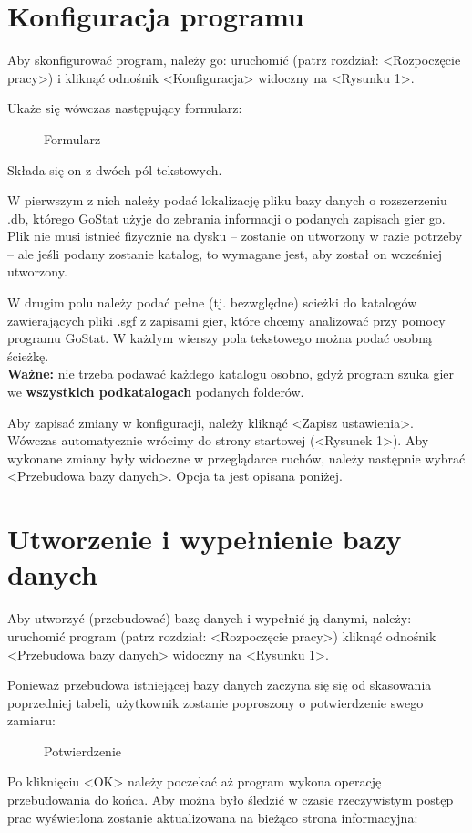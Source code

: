 \documentclass[10pt,leqno]{article}
\newcommand{\myimage}[3]{
  \begin{figure}[h!]
    \centering
      \fbox{\texttt{[image: \#2]}}
  \caption{#3}
  \end{figure}
}
\begin{document}
\section{Konfiguracja programu}
Aby skonfigurować program, należy go: uruchomić (patrz rozdział: <Rozpoczęcie pracy>) i kliknąć odnośnik <Konfiguracja> widoczny na <Rysunku 1>.

Ukaże się wówczas następujący formularz:

\newpage

\myimage{0.4}{formularz.png}{Formularz}

Składa się on z dwóch pól tekstowych. 

W pierwszym z nich należy podać lokalizację pliku bazy danych o rozszerzeniu .db, którego GoStat użyje do zebrania informacji o podanych zapisach gier go.
Plik nie musi istnieć fizycznie na dysku -- zostanie on utworzony w razie potrzeby -- ale jeśli podany zostanie katalog, to wymagane jest, aby został on
wcześniej utworzony.

W drugim polu należy podać pełne (tj. bezwględne) scieżki do katalogów zawierających pliki .sgf z zapisami gier, które chcemy analizować przy pomocy
programu GoStat. W każdym wierszy pola tekstowego można podać osobną ścieżkę. \\
\textbf{Ważne:} nie trzeba podawać każdego katalogu osobno, gdyż program szuka gier we \textbf{wszystkich podkatalogach} podanych folderów.

Aby zapisać zmiany w konfiguracji, należy kliknąć <Zapisz ustawienia>. Wówczas automatycznie wrócimy do strony startowej (<Rysunek 1>). 
Aby wykonane zmiany były widoczne w przeglądarce ruchów, należy następnie wybrać <Przebudowa bazy danych>. Opcja ta jest opisana poniżej.

\section{Utworzenie i wypełnienie bazy danych}
Aby utworzyć (przebudować) bazę danych i wypełnić ją danymi, należy: 
  uruchomić program (patrz rozdział: <Rozpoczęcie pracy>)
  kliknąć odnośnik <Przebudowa bazy danych> widoczny na <Rysunku 1>.

Ponieważ przebudowa istniejącej bazy danych zaczyna się się od skasowania poprzedniej tabeli, użytkownik zostanie
poproszony o potwierdzenie swego zamiaru:

\myimage{1.0}{potwierdzenie.png}{Potwierdzenie}

Po kliknięciu <OK> należy poczekać aż program wykona operację przebudowania do końca. 
Aby można było śledzić w czasie rzeczywistym postęp prac wyświetlona zostanie aktualizowana na bieżąco strona informacyjna:
\end{document}
